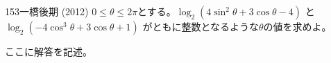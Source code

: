 \begin{prob}{153}{\maru}{一橋後期 (2012)}
 $0\le\theta\le 2\pi$とする。$\log_2 (4\sin^2\theta+3\cos\theta-4)$ と $\log_2 (-4\cos^3\theta+3\cos\theta+1)$ がともに整数となるような$\theta$の値を求めよ。
\end{prob}
ここに解答を記述。